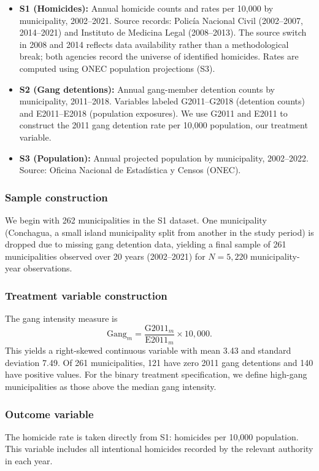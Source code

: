 \documentclass[12pt]{article}
\begin{document}
\begin{itemize}
  \item \textbf{S1 (Homicides):} Annual homicide counts and rates per 10,000 by municipality, 2002--2021. Source records: Polic\'ia Nacional Civil (2002--2007, 2014--2021) and Instituto de Medicina Legal (2008--2013). The source switch in 2008 and 2014 reflects data availability rather than a methodological break; both agencies record the universe of identified homicides. Rates are computed using ONEC population projections (S3).

  \item \textbf{S2 (Gang detentions):} Annual gang-member detention counts by municipality, 2011--2018. Variables labeled G2011--G2018 (detention counts) and E2011--E2018 (population exposures). We use G2011 and E2011 to construct the 2011 gang detention rate per 10,000 population, our treatment variable.

  \item \textbf{S3 (Population):} Annual projected population by municipality, 2002--2022. Source: Oficina Nacional de Estad\'istica y Censos (ONEC).
\end{itemize}

\subsubsection*{Sample construction} We begin with 262 municipalities in the S1 dataset. One municipality (Conchagua, a small island municipality split from another in the study period) is dropped due to missing gang detention data, yielding a final sample of 261 municipalities observed over 20 years (2002--2021) for $N = 5{,}220$ municipality-year observations.

\subsubsection*{Treatment variable construction} The gang intensity measure is
\[
\text{Gang}_m = \frac{\text{G2011}_m}{\text{E2011}_m} \times 10{,}000.
\]
This yields a right-skewed continuous variable with mean 3.43 and standard deviation 7.49. Of 261 municipalities, 121 have zero 2011 gang detentions and 140 have positive values. For the binary treatment specification, we define high-gang municipalities as those above the median gang intensity.

\subsubsection*{Outcome variable} The homicide rate is taken directly from S1: homicides per 10,000 population. This variable includes all intentional homicides recorded by the relevant authority in each year.
\end{document}
